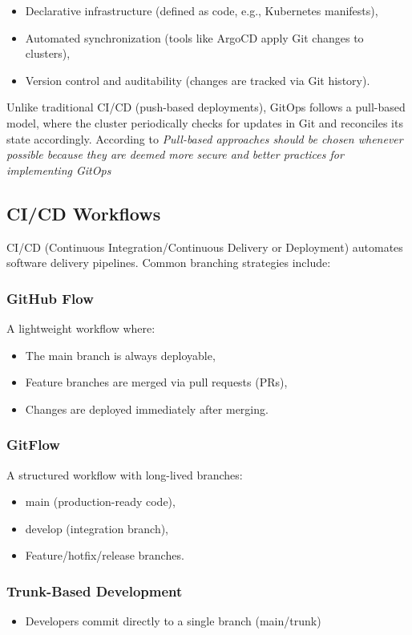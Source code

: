 \begin{itemize}
\item Declarative infrastructure (defined as code, e.g., Kubernetes manifests),
\item Automated synchronization (tools like ArgoCD apply Git changes to clusters),
\item Version control and auditability (changes are tracked via Git history).
\end{itemize}
Unlike traditional CI/CD (push-based deployments), GitOps follows a pull-based model, where the cluster periodically checks for updates in Git and reconciles its state accordingly\cite{devopsbook}.
According to\cite{inproceedings} \textit{Pull-based approaches should be chosen whenever possible because they are deemed
more secure and better practices for implementing GitOps}

\subsection{CI/CD Workflows}\label{subsec:ci/cd-workflows}
CI/CD
 (Continuous Integration/Continuous Delivery or Deployment) automates
software delivery pipelines.
Common branching strategies include:

\subsubsection*{GitHub Flow}
A lightweight workflow where\cite{rodriguez2021unifying}:
\begin{itemize}
    \item The main branch is always deployable,
    \item Feature branches are merged via pull requests (PRs),
    \item Changes are deployed immediately after merging.
\end{itemize}
\subsubsection*{GitFlow}
A structured workflow with long-lived branches\cite{rodriguez2021unifying}:
\begin{itemize}
    \item main (production-ready code),
    \item develop (integration branch),
    \item Feature/hotfix/release branches.
\end{itemize}
\subsubsection*{Trunk-Based Development}
\begin{itemize}
    \item Developers commit directly to a single branch (main/trunk)\cite{shahin2017continuous}
\end{itemize}

